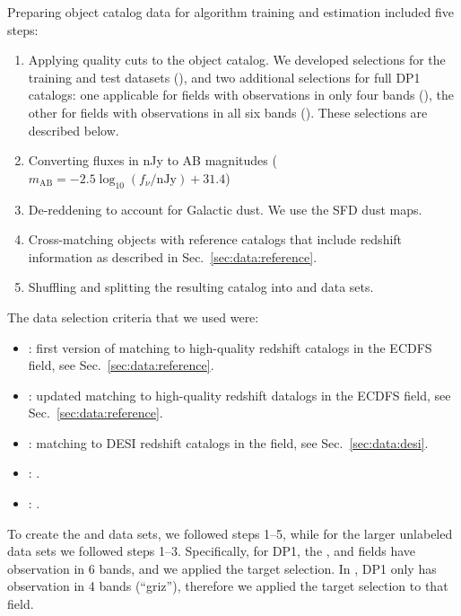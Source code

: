 Preparing object catalog data for \photoz algorithm training and estimation included five steps:

\begin{enumerate}
\item{Applying quality cuts to the object catalog.   We developed selections for the training and test datasets (), and two additional selections for full DP1 catalogs: one applicable for fields with observations in only four bands (), the other for fields with observations in all six bands ().  These selections are described below.}
\item{Converting fluxes in nJy to AB magnitudes ($m_\text{AB} = -2.5 \log_{10}(f_\nu / \text{nJy}) + 31.4$)}
\item{De-reddening to account for Galactic dust.  We use the SFD dust maps\citep{SFD}.}
\item{Cross-matching objects with reference catalogs that include redshift information as described in Sec.~\ref{sec:data:reference}.}
\item{Shuffling and splitting the resulting catalog into  and  data sets.}
\end{enumerate}

The data selection criteria that we used were:
\begin{itemize}
\item{: first version of matching to high-quality redshift catalogs in the ECDFS field,  see Sec.~\ref{sec:data:reference}.}
\item{: updated matching to high-quality redshift datalogs in the ECDFS field, see Sec.~\ref{sec:data:reference}.}
\item{: matching to DESI redshift catalogs in the  field, see Sec.~\ref{sec:data:desi}.}
\item{: .}
\item{: .}
\end{itemize}

To create the  and  data sets, we followed steps 1--5, while for the larger unlabeled data sets we followed steps 1--3.  Specifically, for DP1, the ,  and  fields have observation in 6 bands, and we applied the  target selection.   In , DP1 only has observation in 4 bands (``griz''), therefore we applied the  target selection to that field. 


